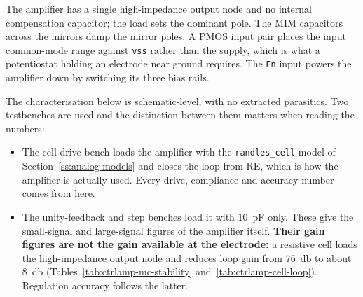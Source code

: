 The amplifier has a single high-impedance output node and no internal compensation
capacitor; the load sets the dominant pole. The MIM capacitors across the mirrors damp
the mirror poles. A PMOS
input pair places the input common-mode range against \texttt{vss} rather than the
supply, which is what a potentiostat holding an electrode near ground requires. The
\texttt{En} input powers the amplifier down by switching its three bias rails.

The characterisation below is schematic-level, with no extracted parasitics. Two
testbenches are used and the distinction between them matters when reading the numbers:

\begin{itemize}
\item The cell-drive bench loads the amplifier with the \texttt{randles\_cell} model of
Section~\ref{ss:analog-models} and closes the loop from RE, which is how the amplifier
is actually used. Every drive, compliance and accuracy number comes from here.
\item The unity-feedback and step benches load it with
\SI{10}{\pico\farad} only. These give the small-signal and large-signal figures of the
amplifier itself. \textbf{Their gain figures are not the gain available at the
electrode:} a resistive cell loads the high-impedance output node and reduces loop gain
from \SI{76}{\decibel} to about \SI{8}{\decibel}
(Tables~\ref{tab:ctrlamp-mc-stability} and~\ref{tab:ctrlamp-cell-loop}). Regulation
accuracy follows the latter.
\end{itemize}
